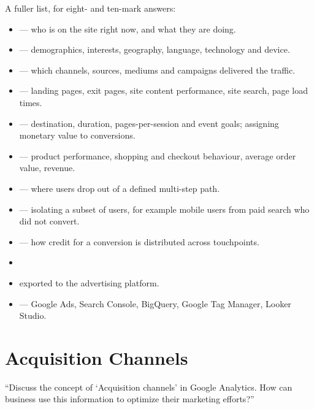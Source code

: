 \documentclass{MMTextbook}
\begin{document}
\noindent A fuller list, for eight- and ten-mark answers:

\begin{itemize}
\item {} --- who is on the site right now, and what they
      are doing.
\item {} --- demographics, interests, geography, language,
      technology and device.
\item {} --- which channels, sources, mediums and
      campaigns delivered the traffic.
\item {} --- landing pages, exit pages, site
      content performance, site search, page load times.
\item {} --- destination, duration,
      pages-per-session and event goals; assigning monetary value to conversions.
\item {} --- product performance, shopping and checkout
      behaviour, average order value, revenue.
\item {} --- where users drop out of a defined
      multi-step path.
\item {} --- isolating a subset of users, for example mobile users
      from paid search who did not convert.
\item {} --- how credit for a conversion is
      distributed across touchpoints.
\item {}
\item {} exported to the advertising
      platform.
\item {} --- Google Ads, Search Console, BigQuery, Google Tag
      Manager, Looker Studio.
\end{itemize}

\section{Acquisition Channels}

\begin{keybox}
``Discuss the concept of `Acquisition channels' in Google Analytics. How can
business use this information to optimize their marketing efforts?''
\end{keybox}
\end{document}
